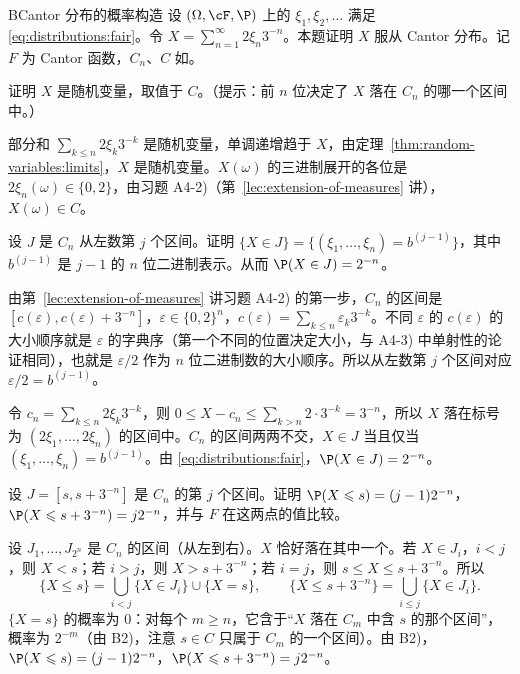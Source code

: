 \begin{probleme}{B}{Cantor 分布的概率构造}
设 $(\Omega,\cF,\P)$ 上的 $\xi_1,\xi_2,\dots$ 满足 \eqref{eq:distributions:fair}。令 $X=\sum_{n=1}^\infty2\xi_n3^{-n}$。本题证明 $X$ 服从 Cantor 分布。记 $F$ 为 Cantor 函数，$C_n$、$C$ 如。
\begin{questions}
\item 证明 $X$ 是随机变量，取值于 $C$。（提示：前 $n$ 位决定了 $X$ 落在 $C_n$ 的哪一个区间中。）
\begin{solution}
部分和 $\sum_{k\leqslant n}2\xi_k3^{-k}$ 是随机变量，单调递增趋于 $X$，由定理~\ref{thm:random-variables:limits}，$X$ 是随机变量。$X(\omega)$ 的三进制展开的各位是 $2\xi_n(\omega)\in\{0,2\}$，由习题 A4-2)（第~\ref{lec:extension-of-measures} 讲），$X(\omega)\in C$。
\end{solution}
\item 设 $J$ 是 $C_n$ 从左数第 $j$ 个区间。证明 $\{X\in J\}=\{(\xi_1,\dots,\xi_n)=b^{(j-1)}\}$，其中 $b^{(j-1)}$ 是 $j-1$ 的 $n$ 位二进制表示。从而 $\P(X\in J)=2^{-n}$。
\begin{solution}
由第~\ref{lec:extension-of-measures} 讲习题 A4-2) 的第一步，$C_n$ 的区间是 $[c(\varepsilon),c(\varepsilon)+3^{-n}]$，$\varepsilon\in\{0,2\}^n$，$c(\varepsilon)=\sum_{k\leqslant n}\varepsilon_k3^{-k}$。不同 $\varepsilon$ 的 $c(\varepsilon)$ 的大小顺序就是 $\varepsilon$ 的字典序（第一个不同的位置决定大小，与 A4-3) 中单射性的论证相同），也就是 $\varepsilon/2$ 作为 $n$ 位二进制数的大小顺序。所以从左数第 $j$ 个区间对应 $\varepsilon/2=b^{(j-1)}$。

令 $c_n=\sum_{k\leqslant n}2\xi_k3^{-k}$，则 $0\leqslant X-c_n\leqslant\sum_{k>n}2\cdot3^{-k}=3^{-n}$，所以 $X$ 落在标号为 $(2\xi_1,\dots,2\xi_n)$ 的区间中。$C_n$ 的区间两两不交，$X\in J$ 当且仅当 $(\xi_1,\dots,\xi_n)=b^{(j-1)}$。由 \eqref{eq:distributions:fair}，$\P(X\in J)=2^{-n}$。
\end{solution}
\item 设 $J=[s,s+3^{-n}]$ 是 $C_n$ 的第 $j$ 个区间。证明 $\P(X\leqslant s)=(j-1)2^{-n}$，$\P(X\leqslant s+3^{-n})=j2^{-n}$，并与 $F$ 在这两点的值比较。
\begin{solution}
设 $J_1,\dots,J_{2^n}$ 是 $C_n$ 的区间（从左到右）。$X$ 恰好落在其中一个。若 $X\in J_i$，$i<j$，则 $X<s$；若 $i>j$，则 $X>s+3^{-n}$；若 $i=j$，则 $s\leqslant X\leqslant s+3^{-n}$。所以
\[
\{X\leqslant s\}=\bigcup_{i<j}\{X\in J_i\}\cup\{X=s\},\qquad\{X\leqslant s+3^{-n}\}=\bigcup_{i\leqslant j}\{X\in J_i\}.
\]
$\{X=s\}$ 的概率为 $0$：对每个 $m\geqslant n$，它含于“$X$ 落在 $C_m$ 中含 $s$ 的那个区间”，概率为 $2^{-m}$（由 B2)，注意 $s\in C$ 只属于 $C_m$ 的一个区间）。由 B2)，$\P(X\leqslant s)=(j-1)2^{-n}$，$\P(X\leqslant s+3^{-n})=j2^{-n}$。


\end{solution}
\end{questions}
\end{probleme}
